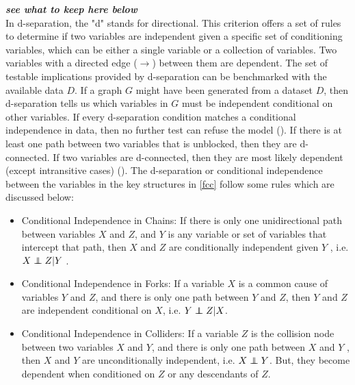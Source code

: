 \textbf{\textit{see what to keep here below}}\\
In d-separation, the "d" stands for directional. This criterion offers a set of rules to determine if two variables are independent given a specific set of conditioning variables, which can be either a single variable or a collection of variables. Two variables with a directed edge ($\rightarrow$) between them are dependent. The set of testable implications provided by d-separation can be benchmarked with the available data $D$. If a graph $G$ might have been generated from a dataset $D$, then d-separation tells us which variables in $G$ must be independent conditional on other variables. If every d-separation condition matches a conditional independence in data, then no further test can refuse the model (\cite{pearl1988probabilistic}). If there is at least one path between two variables that is unblocked, then they are d-connected. If two variables are d-connected, then they are most likely dependent (except intransitive cases) (\cite{pearl1988probabilistic}). The d-separation or conditional independence between the variables in the key structures in \ref{fcc} follow some rules which are discussed below:\\
\begin{itemize}
    \item Conditional Independence in Chains: If there is only one unidirectional path between variables $X$ and $Z$, and $Y$ is any variable or set of variables that intercept that path, then $X$ and $Z$ are conditionally independent given $Y$ , i.e. $X \independent Z | Y$ .
    \item Conditional Independence in Forks: If a variable $X$ is a common cause of variables $Y$ and $Z$, and there is only one path between $Y$ and $Z$, then $Y$ and $Z$ are independent conditional on $X$, i.e. $Y \independent Z | X$.
    \item Conditional Independence in Colliders: If a variable $Z$ is the collision node between two variables $X$ and $Y$, and there is only one path between $X$ and $Y$ , then $X$ and $Y$ are unconditionally independent, i.e. $X \independent Y$. But, they become dependent when conditioned on $Z$ or any descendants of $Z$.
\end{itemize}

